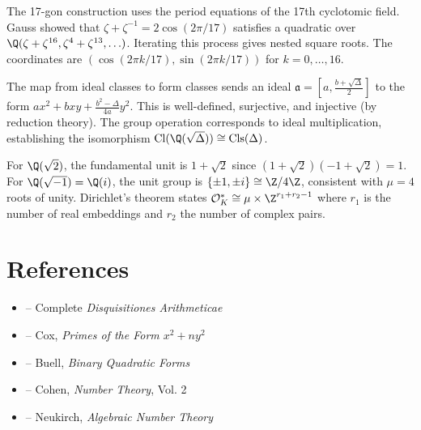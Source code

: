 \begin{solution}
The 17-gon construction uses the period equations of the 17th cyclotomic field. Gauss showed that $\zeta + \zeta^{-1} = 2\cos(2\pi/17)$ satisfies a quadratic over $\Q(\zeta+\zeta^{16}, \zeta^4+\zeta^{13}, \ldots)$. Iterating this process gives nested square roots. The coordinates are $(\cos(2\pi k/17), \sin(2\pi k/17))$ for $k = 0, \ldots, 16$.
\end{solution}

\begin{solution}
The map from ideal classes to form classes sends an ideal $\mathfrak{a} = [a, \frac{b+\sqrt{\Delta}}{2}]$ to the form $a x^2 + bxy + \frac{b^2-\Delta}{4a} y^2$. This is well-defined, surjective, and injective (by reduction theory). The group operation corresponds to ideal multiplication, establishing the isomorphism $\operatorname{Cl}(\Q(\sqrt{\Delta})) \cong \operatorname{Cls}(\Delta)$.
\end{solution}

\begin{solution}
For $\Q(\sqrt{2})$, the fundamental unit is $1+\sqrt{2}$ since $(1+\sqrt{2})(-1+\sqrt{2}) = 1$. For $\Q(\sqrt{-1}) = \Q(i)$, the unit group is $\{\pm 1, \pm i\} \cong \Z/4\Z$, consistent with $\mu = 4$ roots of unity. Dirichlet's theorem states $\mathcal{O}_K^* \cong \mu \times \Z^{r_1+r_2-1}$ where $r_1$ is the number of real embeddings and $r_2$ the number of complex pairs.
\end{solution}


\section{References}

\begin{itemize}
    \item \cite{gauss-disq} -- Complete \textit{Disquisitiones Arithmeticae}
    \item \cite{cox-primes} -- Cox, \textit{Primes of the Form $x^2+ny^2$}
    \item \cite{buell-binary} -- Buell, \textit{Binary Quadratic Forms}
    \item \cite{cohen-forms} -- Cohen, \textit{Number Theory}, Vol. 2
    \item \cite{neukirch} -- Neukirch, \textit{Algebraic Number Theory}
\end{itemize}